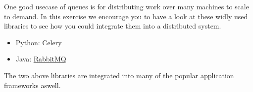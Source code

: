 \documentclass{csse4400}
\begin{document}
One good usecase of queues is for distributing work over many machines to scale to demand. In this exercise we encourage you to have a look at these widly used libraries to see how you could integrate them into a distributed system.

\begin{itemize}
  \item Python: \href{https://docs.celeryq.dev/en/stable/}{Celery}
  \item Java: \href{https://www.rabbitmq.com/tutorials/tutorial-one-java.html}{RabbitMQ}
\end{itemize}

The two above libraries are integrated into many of the popular application frameworks aswell.



\end{document}
